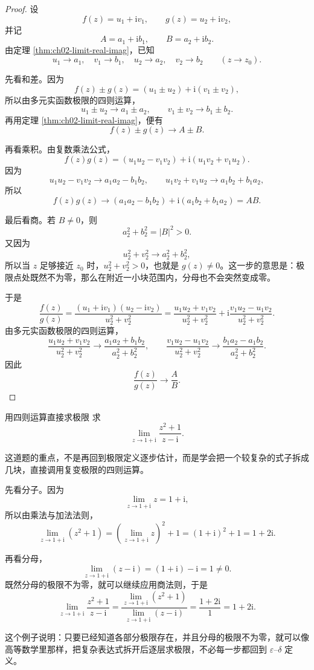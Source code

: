 \begin{proof}
设
\[
    f(z)=u_1+\mathrm{i}v_1,\qquad g(z)=u_2+\mathrm{i}v_2,
\]
并记
\[
    A=a_1+\mathrm{i}b_1,\qquad B=a_2+\mathrm{i}b_2.
\]
由定理 \ref{thm:ch02-limit-real-imag}，已知
\[
    u_1\to a_1,\quad v_1\to b_1,\quad u_2\to a_2,\quad v_2\to b_2
    \qquad (z\to z_0).
\]

先看和差。因为
\[
    f(z)\pm g(z)
    =(u_1\pm u_2)+\mathrm{i}(v_1\pm v_2),
\]
所以由多元实函数极限的四则运算，
\[
    u_1\pm u_2\to a_1\pm a_2,\qquad v_1\pm v_2\to b_1\pm b_2.
\]
再用定理 \ref{thm:ch02-limit-real-imag}，便有
\[
    f(z)\pm g(z)\to A\pm B.
\]

再看乘积。由复数乘法公式，
\[
    f(z)g(z)
    =(u_1u_2-v_1v_2)+\mathrm{i}(u_1v_2+v_1u_2).
\]
因为
\[
    u_1u_2-v_1v_2\to a_1a_2-b_1b_2,\qquad
    u_1v_2+v_1u_2\to a_1b_2+b_1a_2,
\]
所以
\[
    f(z)g(z)\to (a_1a_2-b_1b_2)+\mathrm{i}(a_1b_2+b_1a_2)=AB.
\]

最后看商。若 $B\neq 0$，则
\[
    a_2^2+b_2^2=|B|^2>0.
\]
又因为
\[
    u_2^2+v_2^2\to a_2^2+b_2^2,
\]
所以当 $z$ 足够接近 $z_0$ 时，$u_2^2+v_2^2>0$，也就是 $g(z)\neq 0$。这一步的意思是：极限点处既然不为零，那么在附近一小块范围内，分母也不会突然变成零。

于是
\[
    \frac{f(z)}{g(z)}
    =\frac{(u_1+\mathrm{i}v_1)(u_2-\mathrm{i}v_2)}{u_2^2+v_2^2}
    =\frac{u_1u_2+v_1v_2}{u_2^2+v_2^2}
    +\mathrm{i}\frac{v_1u_2-u_1v_2}{u_2^2+v_2^2}.
\]
由多元实函数极限的四则运算，
\[
    \frac{u_1u_2+v_1v_2}{u_2^2+v_2^2}\to \frac{a_1a_2+b_1b_2}{a_2^2+b_2^2},
    \qquad
    \frac{v_1u_2-u_1v_2}{u_2^2+v_2^2}\to \frac{b_1a_2-a_1b_2}{a_2^2+b_2^2}.
\]
因此
\[
    \frac{f(z)}{g(z)}\to \frac{A}{B}.
\]
\end{proof}

\begin{lizi}{用四则运算直接求极限}{}
求
\[
    \lim_{z\to 1+\mathrm{i}}\frac{z^2+1}{z-\mathrm{i}}.
\]

\begin{jie}
这道题的重点，不是再回到极限定义逐步估计，而是学会把一个较复杂的式子拆成几块，直接调用复变极限的四则运算。

先看分子。因为
\[
    \lim_{z\to 1+\mathrm{i}} z=1+\mathrm{i},
\]
所以由乘法与加法法则，
\[
    \lim_{z\to 1+\mathrm{i}}(z^2+1)
    =
    \left(\lim_{z\to 1+\mathrm{i}} z\right)^2+1
    =
    (1+\mathrm{i})^2+1
    =
    1+2\mathrm{i}.
\]

再看分母，
\[
    \lim_{z\to 1+\mathrm{i}}(z-\mathrm{i})
    =
    (1+\mathrm{i})-\mathrm{i}
    =
    1\neq 0.
\]
既然分母的极限不为零，就可以继续应用商法则，于是
\[
    \lim_{z\to 1+\mathrm{i}}\frac{z^2+1}{z-\mathrm{i}}
    =
    \frac{\lim\limits_{z\to 1+\mathrm{i}}(z^2+1)}
         {\lim\limits_{z\to 1+\mathrm{i}}(z-\mathrm{i})}
    =
    \frac{1+2\mathrm{i}}{1}
    =
    1+2\mathrm{i}.
\]

这个例子说明：只要已经知道各部分极限存在，并且分母的极限不为零，就可以像高等数学里那样，把复杂表达式拆开后逐层求极限，不必每一步都回到 $\varepsilon$--$\delta$ 定义。
\end{jie}
\end{lizi}

